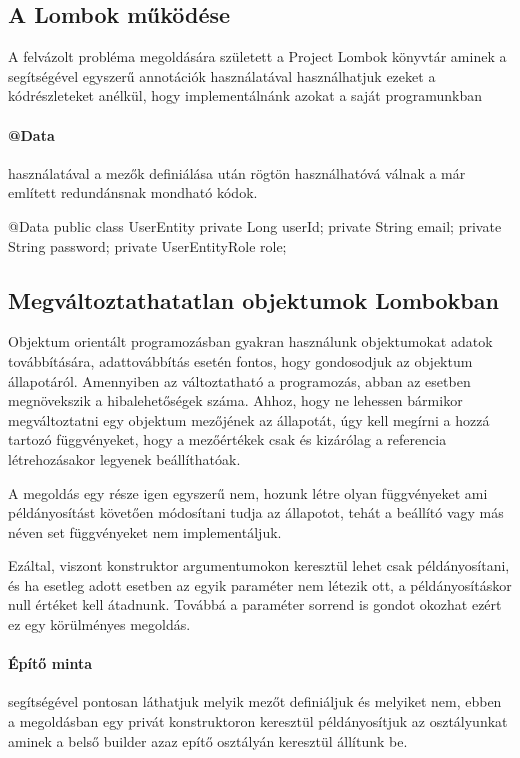 \subsection{A Lombok működése}
A felvázolt probléma megoldására született a Project Lombok\cite{lombok} könyvtár aminek a segítségével egyszerű annotációk használatával használhatjuk ezeket a kódrészleteket anélkül, hogy implementálnánk azokat a saját programunkban

\paragraph{@Data} használatával a mezők definiálása után rögtön használhatóvá válnak a már említett redundánsnak mondható kódok.
\begin{java}
	@Data
	public class UserEntity {
		private Long userId;
		private String email;
		private String password;
		private UserEntityRole role;
	}
	
\end{java}

\subsection{Megváltoztathatatlan objektumok Lombokban}
Objektum orientált programozásban gyakran használunk objektumokat adatok továbbítására, adattovábbítás esetén fontos, hogy gondosodjuk az objektum állapotáról. Amennyiben az változtatható a programozás, abban az esetben megnövekszik a hibalehetőségek száma.
\vskip 0.2in
Ahhoz, hogy ne lehessen bármikor megváltoztatni egy objektum mezőjének az állapotát, úgy kell megírni a hozzá tartozó függvényeket, hogy a mezőértékek csak és kizárólag a referencia létrehozásakor legyenek beállíthatóak.

A megoldás egy része igen egyszerű nem, hozunk létre olyan függvényeket ami példányosítást követően módosítani tudja az állapotot, tehát a beállító vagy más néven set függvényeket nem implementáljuk.

Ezáltal, viszont konstruktor argumentumokon keresztül lehet csak példányosítani, és ha esetleg adott esetben az egyik paraméter nem létezik ott, a példányosításkor null értéket kell átadnunk. Továbbá a paraméter sorrend is gondot okozhat ezért ez egy körülményes megoldás.

\paragraph{Építő minta} segítségével pontosan láthatjuk melyik mezőt definiáljuk és melyiket nem, ebben a megoldásban egy privát konstruktoron keresztül példányosítjuk az osztályunkat aminek a belső builder azaz epítő osztályán keresztül állítunk be.

